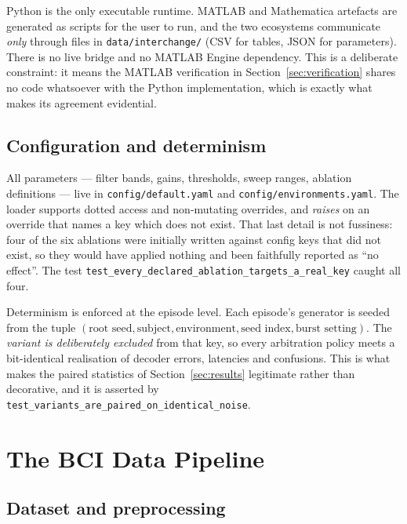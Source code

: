 \documentclass[11pt,a4paper]{article}
\theoremstyle{plain}
\theoremstyle{definition}
\begin{document}
Python is the only executable runtime. MATLAB and Mathematica artefacts
are generated as scripts for the user to run, and the two ecosystems
communicate \emph{only} through files in \texttt{data/interchange/}
(CSV for tables, JSON for parameters). There is no live bridge and no
MATLAB Engine dependency. This is a deliberate constraint: it means the
MATLAB verification in Section~\ref{sec:verification} shares no code
whatsoever with the Python implementation, which is exactly what makes
its agreement evidential.

\subsection{Configuration and determinism}

All parameters --- filter bands, gains, thresholds, sweep ranges,
ablation definitions --- live in \texttt{config/default.yaml} and
\texttt{config/environments.yaml}. The loader supports dotted access and
non-mutating overrides, and \emph{raises} on an override that names a
key which does not exist. That last detail is not fussiness: four of the
six ablations were initially written against config keys that did not
exist, so they would have applied nothing and been faithfully reported
as ``no effect''. The test
\texttt{test\_every\_declared\_ablation\_targets\_a\_real\_key} caught
all four.

Determinism is enforced at the episode level. Each episode's generator
is seeded from the tuple $(\text{root seed}, \text{subject},
\text{environment}, \text{seed index}, \text{burst setting})$. The
\emph{variant is deliberately excluded} from that key, so every
arbitration policy meets a bit-identical realisation of decoder errors,
latencies and confusions. This is what makes the paired statistics of
Section~\ref{sec:results} legitimate rather than decorative, and it is
asserted by
\texttt{test\_variants\_are\_paired\_on\_identical\_noise}.

\section{The BCI Data Pipeline}
\label{sec:bci}

\subsection{Dataset and preprocessing}
\end{document}
